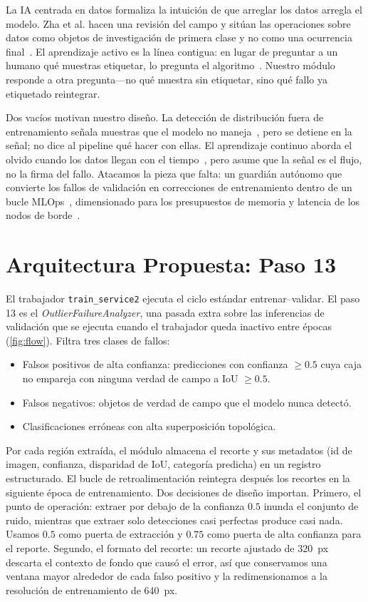 \documentclass[conference]{IEEEtran}
\begin{document}
La IA centrada en datos formaliza la intuición de que arreglar los datos
arregla el modelo. Zha et al. hacen una revisión del campo y sitúan las
operaciones sobre datos como objetos de investigación de primera clase y no
como una ocurrencia final~\cite{zha2023datacentric}. El aprendizaje activo es
la línea contigua: en lugar de preguntar a un humano qué muestras etiquetar,
lo pregunta el algoritmo~\cite{settles2012active}. Nuestro módulo responde a
otra pregunta---no qué muestra sin etiquetar, sino qué fallo ya etiquetado
reintegrar.

Dos vacíos motivan nuestro diseño. La detección de distribución fuera de
entrenamiento señala muestras que el modelo no maneja~\cite{hendrycks2017ood},
pero se detiene en la señal; no dice al pipeline qué hacer con ellas. El
aprendizaje continuo aborda el olvido cuando los datos llegan con el
tiempo~\cite{parisi2019continual}, pero asume que la señal es el flujo, no la
firma del fallo. Atacamos la pieza que falta: un guardián autónomo que
convierte los fallos de validación en correcciones de entrenamiento dentro de
un bucle MLOps~\cite{kreuzberger2023mlops}, dimensionado para los presupuestos
de memoria y latencia de los nodos de borde~\cite{zhou2019edge}.

\section{Arquitectura Propuesta: Paso 13}
El trabajador \texttt{train\_service2} ejecuta el ciclo estándar
entrenar--validar. El paso 13 es el \textit{OutlierFailureAnalyzer}, una
pasada extra sobre las inferencias de validación que se ejecuta cuando el
trabajador queda inactivo entre épocas (\cref{fig:flow}). Filtra tres clases de
fallos:

\begin{itemize}
\item Falsos positivos de alta confianza: predicciones con confianza
\(\geq 0.5\) cuya caja no empareja con ninguna verdad de campo a IoU
\(\geq 0.5\).
\item Falsos negativos: objetos de verdad de campo que el modelo nunca
detectó.
\item Clasificaciones erróneas con alta superposición topológica.
\end{itemize}

Por cada región extraída, el módulo almacena el recorte y sus metadatos (id de
imagen, confianza, disparidad de IoU, categoría predicha) en un registro
estructurado. El bucle de retroalimentación reintegra después los recortes en
la siguiente época de entrenamiento. Dos decisiones de diseño importan.
Primero, el punto de operación: extraer por debajo de la confianza \(0.5\)
inunda el conjunto de ruido, mientras que extraer solo detecciones casi
perfectas produce casi nada. Usamos \(0.5\) como puerta de extracción y
\(0.75\) como puerta de alta confianza para el reporte. Segundo, el formato
del recorte: un recorte ajustado de 320~px descarta el contexto de fondo que
causó el error, así que conservamos una ventana mayor alrededor de cada falso
positivo y la redimensionamos a la resolución de entrenamiento de 640~px.
\end{document}
